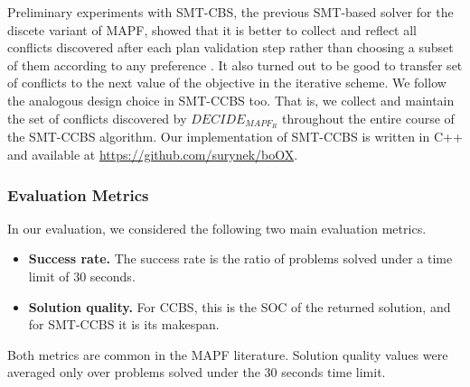 \documentclass[review]{elsarticle}
\newcommand{\decidemapfr}{\ensuremath{\mathit{DECIDE_{MAPF_R}}}\xspace}
\newcommand{\ccbs}{\ac{CCBS}\xspace}
\newcommand{\smtcbsO}{SMT-CBS\xspace} %
\newcommand{\smtccbs}{SMT-CCBS\xspace}
\newcommand{\mapf}{\ac{MAPF}\xspace}
\begin{document}
Preliminary experiments with \smtcbsO, the previous SMT-based solver for the discete variant of \mapf, showed that it is better to collect and reflect all conflicts discovered after each plan validation step rather than choosing a subset of them according to any preference \cite{surynek2019lazy}. It also turned out to be good to transfer set of conflicts to the next value of the objective in the iterative scheme. We follow the analogous design choice in \smtccbs too. That is, we collect and maintain the set of conflicts discovered by \decidemapfr throughout the entire course of the \smtccbs algorithm. Our implementation of \smtccbs is written in C++ and available at \url{https://github.com/surynek/boOX}.


\subsubsection{Evaluation Metrics}
In our evaluation, we considered the following two main evaluation metrics. 
\begin{itemize}
    \item \textbf{Success rate.} The success rate is the ratio of problems solved under a time limit of 30 seconds. 
    \item \textbf{Solution quality.} For \ccbs, this is the SOC of the returned solution, and for \smtccbs it is its makespan.
\end{itemize}

Both metrics are common in the \mapf literature. Solution quality values were averaged only over problems solved under the 30 seconds time limit. 
\end{document}
